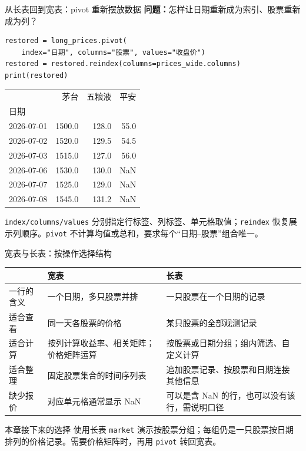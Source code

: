 \documentclass[9pt]{ctexbeamer}
\begin{document}
\begin{frame}[fragile]{从长表回到宽表：pivot 重新摆放数据}
\small \textbf{问题：}怎样让日期重新成为索引、股票重新成为列？
\begin{lstlisting}
restored = long_prices.pivot(
    index="日期", columns="股票", values="收盘价")
restored = restored.reindex(columns=prices_wide.columns)
print(restored)
\end{lstlisting}
\begin{center}
\small
\begin{tabular}{l@{\hspace{1em}}rrr}
\toprule
 & 茅台 & 五粮液 & 平安 \\
日期 & & & \\
\midrule
2026-07-01 & 1500.0 & 128.0 & 55.0 \\
2026-07-02 & 1520.0 & 129.5 & 54.5 \\
2026-07-03 & 1515.0 & 127.0 & 56.0 \\
2026-07-06 & 1530.0 & 130.0 & NaN \\
2026-07-07 & 1525.0 & 129.0 & NaN \\
2026-07-08 & 1545.0 & 131.2 & NaN \\
\bottomrule
\end{tabular}
\end{center}
\small \texttt{index/columns/values} 分别指定行标签、列标签、单元格取值；\texttt{reindex} 恢复展示列顺序。\texttt{pivot} 不计算均值或总和，要求每个“日期--股票”组合唯一。
\end{frame}

\begin{frame}{宽表与长表：按操作选择结构}
\small
\begin{center}
\begin{tabular}{p{}p{}p{}}
\toprule
 & 宽表 & 长表 \\
\midrule
一行的含义 & 一个日期，多只股票并排 & 一只股票在一个日期的记录 \\[5pt]
适合查看 & 同一天各股票的价格 & 某只股票的全部观测记录 \\[5pt]
适合计算 & 按列计算收益率、相关矩阵；价格矩阵运算 & 按股票或日期分组；组内筛选、自定义计算 \\[5pt]
适合整理 & 固定股票集合的时间序列表 & 追加股票记录、按股票和日期连接其他信息 \\[5pt]
缺少报价 & 对应单元格通常显示 NaN & 可以是含 NaN 的行，也可以没有该行，需说明口径 \\
\bottomrule
\end{tabular}
\end{center}
\begin{block}{本章接下来的选择}
使用长表 \texttt{market} 演示按股票分组；每组仍是一只股票按日期排列的价格记录。需要价格矩阵时，再用 \texttt{pivot} 转回宽表。
\end{block}
\end{frame}
\end{document}
